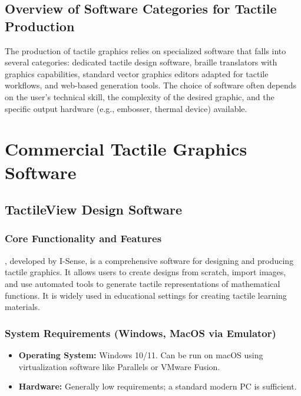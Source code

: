 \subsection{Overview of Software Categories for Tactile Production}\label{ch14:ssec:software-categories}
The production of tactile graphics relies on specialized software that falls into several categories: dedicated tactile design software, braille translators with graphics capabilities, standard vector graphics editors adapted for tactile workflows, and web-based generation tools. The choice of software often depends on the user's technical skill, the complexity of the desired graphic, and the specific output hardware (e.g., embosser, thermal device) available.

\section{Commercial Tactile Graphics Software}\label{ch14:sec:commercial-software}
\subsection{TactileView Design Software}\label{ch14:ssec:tactileview}
\subsubsection{Core Functionality and Features}\label{ch14:sssec:tactileview-features}
, developed by I-Sense, is a comprehensive software for designing and producing tactile graphics. It allows users to create designs from scratch, import images, and use automated tools to generate tactile representations of mathematical functions. It is widely used in educational settings for creating tactile learning materials.

\subsubsection{System Requirements (Windows, MacOS via Emulator)}\label{ch14:sssec:tactileview-sysreq}
\begin{itemize}
	\item \textbf{Operating System:} Windows 10/11. Can be run on macOS using virtualization software like Parallels or VMware Fusion.
	\item \textbf{Hardware:} Generally low requirements; a standard modern PC is sufficient.
\end{itemize}

